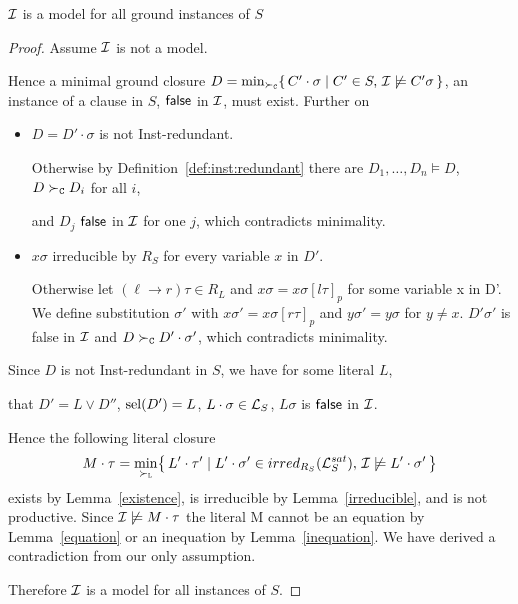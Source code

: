       \begin{lemma}\label{lemma:model:is:candidate}
           \( \mathcal{I} \) is a model for all ground instances of \( S \)
       \end{lemma}

       \begin{proof}
            Assume \( \mathcal{I} \) is not a model.

            Hence a minimal ground closure \(
                D = \min_{\mathrel\succ_{\mathtt{C}}} \{ \,
                C'\cdot\sigma \mid C'\in S, \,
               \mathcal{I}\not\models C'\sigma \,
               \} \),
                an instance of a clause in \( S \),
               \( \mathsf{false} \) in \( \mathcal{I} \), must exist. Further on

       \begin{itemize}
           \item \( D = D'\cdot\sigma \) is not Inst-redundant.
           \vspace{0.2em}

            Otherwise by Definition~\ref{def:inst:redundant} there are
           \( D_1,\ldots,D_n\models D \), \( D\mathrel\succ_{\mathtt{C}} D_i \) for all \( i \),

            and \( D_j \) \( \mathsf{false} \) in \( \mathcal{I} \) for one \( j \), which contradicts minimality.
           \hfill

           \item \( x\sigma \) irreducible by \( R_S \) for every variable \( x \) in \( D' \).
           \vspace{0.2em}

            Otherwise let \( (\ell\to r)\tau\in R_L \) and \( x\sigma = x\sigma{[l\tau]}_p \) for some variable x in D'.
            We define substitution \( \sigma' \) with \( x\sigma' = x\sigma{[r\tau]}_p \) and \( y\sigma' = y\sigma \) for \( y\neq x \).
           \( D'\sigma' \) is false in \( \mathcal{I} \) and \( D\mathrel\succ_{\mathtt{C}} D'\cdot\sigma' \),
            which contradicts minimality.\hfill
       \end{itemize}

        Since \( D \) is not Inst-redundant in \( S \),
        we have for some literal \( L \),

        that \( D' = L\lor D'' \), \( \operatorname{sel}(D') = L \), \( L\cdot\sigma\in\mathcal{L}_S \),
       \( L\sigma \) is \( \mathsf{false} \) in \( \mathcal{I} \).
       \vspace{0.7em}

        Hence the following literal closure
       \begin{gather*}
            M\cdot\tau = \min_{\mathrel\succ_{\mathtt{L}}}\!
   \left \{ \,
        L'\cdot\tau' \mid
        L'\cdot\sigma' \in irred_{R_S}(\mathcal{L}_S^{sat}), \,
       \mathcal{I}\not\models L'\cdot\sigma' \,
   \right \}
       \end{gather*}
        exists by Lemma~\ref{existence}, is irreducible by Lemma~\ref{irreducible},
        and is not productive.
        Since \( \mathcal{I}\not\models M\cdot\tau \) the literal
        M cannot be an equation by Lemma~\ref{equation}
        or an inequation by Lemma~\ref{inequation}.
        We have derived a contradiction from our only assumption.

        Therefore \( \mathcal{I} \) is a model for all instances of \( S \).
   \end{proof}



